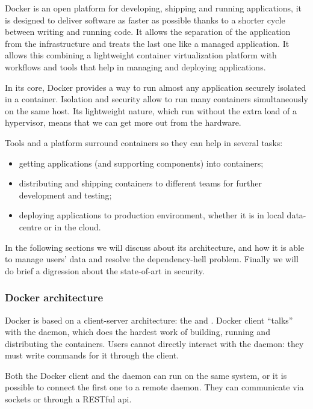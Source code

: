 Docker is an open platform for developing, shipping and running applications, it is designed to deliver
software as faster as possible thanks to a shorter cycle between writing and running code. It allows the
separation of the application from the infrastructure and treats the last one like a managed application.
It allows this combining a lightweight container virtualization platform with workflows and tools
that help in managing and deploying applications.

In its core, Docker provides a way to run almost any application securely isolated in a container.
Isolation and security allow to run many containers simultaneously on the same host. Its lightweight
nature, which run without the extra load of a hypervisor, means that we can get more out from the
hardware.

Tools and a platform surround containers so they can help in several tasks:

\begin{itemize}
	\item{getting applications (and supporting components) into containers;}
	\item{distributing and shipping containers to different teams for further development and testing;}
	\item{deploying applications to production environment, whether it is in local data-centre or in the
		cloud.}
\end{itemize}

In the following sections we will discuss about its architecture, and how it is able to manage users'
data and resolve the dependency-hell problem. Finally we will do brief a digression about the state-of-art
in security.

\subsubsection{Docker architecture}
\label{sec:background-deployments-docker-architecture}
Docker is based on a client-server architecture: the  and . Docker
client ``talks'' with the daemon, which does the hardest work of building, running and distributing
the containers. Users cannot directly interact with the daemon: they must write commands for it 
through the client.

Both the Docker client and the daemon can run on the same system, or it is possible to connect the
first one to a remote daemon. They can communicate via sockets or through a RESTful \acs{api}.

